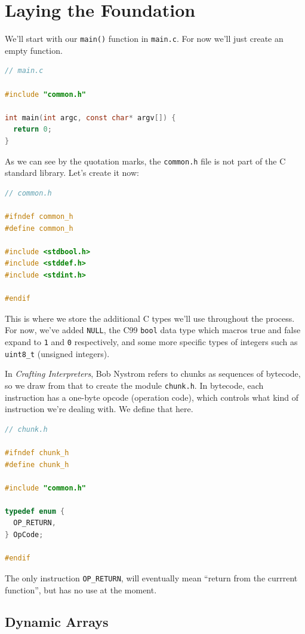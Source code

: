 \section{Laying the Foundation}

We'll start with our \verb+main()+ function in \verb+main.c+. For now we'll just create an empty function.

\begin{lstlisting}[language=C]
// main.c

#include "common.h"

int main(int argc, const char* argv[]) {
  return 0;
}
\end{lstlisting}

As we can see by the quotation marks, the \verb+common.h+ file is not part of the C standard library. Let's create it now:

\begin{lstlisting}[language=C]
// common.h

#ifndef common_h
#define common_h

#include <stdbool.h>
#include <stddef.h>
#include <stdint.h>

#endif
\end{lstlisting}

This is where we store the additional C types we'll use throughout the process. For now, we've added \verb+NULL+, the C99 \verb+bool+ data type which macros true and false expand to \verb.1. and \verb.0. respectively, and some more specific types of integers such as \verb+uint8_t+ (unsigned integers). 

In \emph{Crafting Interpreters}, Bob Nystrom refers to chunks as sequences of bytecode, so we draw from that to create the module \verb+chunk.h+. In bytecode, each instruction has a one-byte opcode (operation code), which controls what kind of instruction we're dealing with. We define that here. 

\begin{lstlisting}[language=C]
// chunk.h

#ifndef chunk_h
#define chunk_h

#include "common.h"

typedef enum {
  OP_RETURN,
} OpCode;

#endif
\end{lstlisting}

The only instruction \verb+OP_RETURN+, will eventually mean ``return from the currrent function'', but has no use at the moment. 


\subsection{Dynamic Arrays}

